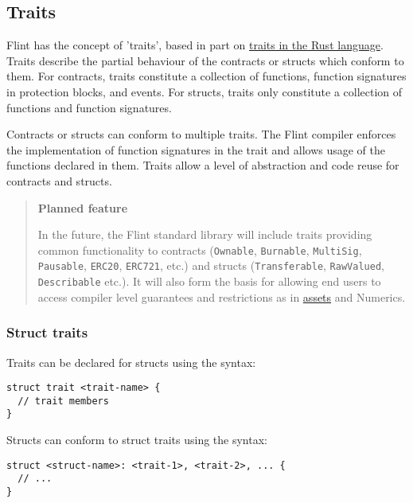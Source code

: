 \subsection{Traits}
\label{sec:appendix-b-traits}

Flint has the concept of 'traits', based in part on \href{https://doc.rust-lang.org/rust-by-example/trait.html}{traits in the Rust language}. Traits describe the partial behaviour of the contracts or structs which conform to them. For contracts, traits constitute a collection of functions, function signatures in protection blocks, and events. For structs, traits only constitute a collection of functions and function signatures.

Contracts or structs can conform to multiple traits. The Flint compiler enforces the implementation of function signatures in the trait and allows usage of the functions declared in them. Traits allow a level of abstraction and code reuse for contracts and structs.

\begin{quote}
\textbf{Planned feature}

In the future, the Flint standard library will include traits providing common functionality to contracts (\texttt{Ownable}, \texttt{Burnable}, \texttt{MultiSig}, \texttt{Pausable}, \texttt{ERC20}, \texttt{ERC721}, etc.) and structs (\texttt{Transferable}, \texttt{RawValued}, \texttt{Describable} etc.). It will also form the basis for allowing end users to access compiler level guarantees and restrictions as in \hyperref[sec:appendix-b-assets]{assets} and Numerics.
\end{quote}

\subsubsection{Struct traits}
\label{sec:appendix-b-struct-traits}

Traits can be declared for structs using the syntax:

\begin{verbatim}
struct trait <trait-name> {
  // trait members
}
\end{verbatim}

Structs can conform to struct traits using the syntax:

\begin{verbatim}
struct <struct-name>: <trait-1>, <trait-2>, ... {
  // ...
}
\end{verbatim}

